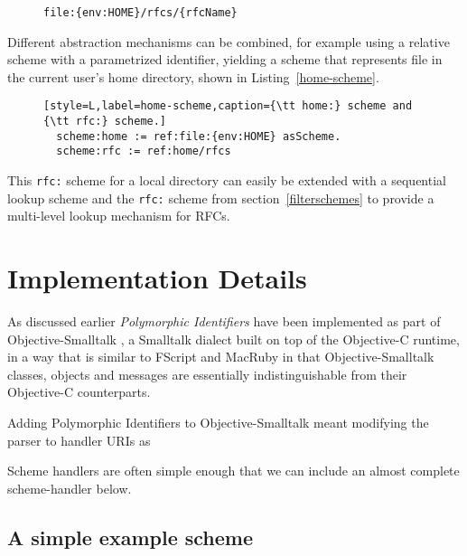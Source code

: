 \documentclass[preprint,authoryear]{llncs}
\begin{document}
\begin{figure}[htbp]
\begin{lstlisting}[style=L,label=rfc-local-ref,caption=Parametrized identifier for local RFC access.]
file:{env:HOME}/rfcs/{rfcName}
\end{lstlisting}
\end{figure}


Different abstraction mechanisms can be combined, for example using a
relative scheme with a parametrized identifier, yielding
a scheme that represents file in the current user's home directory, shown
in Listing~\ref{home-scheme}.


\begin{figure}[htbp]
\begin{lstlisting}[style=L,label=home-scheme,caption={\tt home:} scheme and {\tt rfc:} scheme.]
  scheme:home := ref:file:{env:HOME} asScheme.
  scheme:rfc := ref:home/rfcs
\end{lstlisting}
\end{figure}

This {\tt rfc:} scheme for a local directory can easily be extended with a sequential lookup scheme
and the {\tt rfc:} scheme from section~\ref{filterschemes} to provide a multi-level lookup mechanism
for RFCs.



\section{Implementation Details}
\label{implementation}

As discussed earlier \emph{Polymorphic Identifiers} have been implemented as part of Objective-Smalltalk \cite{objst},
a Smalltalk dialect built on top of the Objective-C\cite{objc-evol}\cite{objc-apple} runtime, 
in a way that is similar to FScript\cite{fscript} and MacRuby \cite{macruby} in that Objective-Smalltalk classes,
objects and messages are essentially indistinguishable from their Objective-C counterparts.

Adding Polymorphic Identifiers to Objective-Smalltalk meant modifying the parser to handler URIs as 

Scheme handlers are often simple enough that we can include an almost complete scheme-handler below.

\subsection{A simple example scheme}
\end{document}

